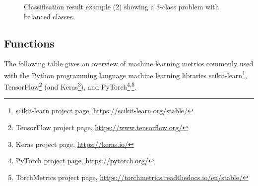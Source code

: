 \documentclass{article}
\begin{document}
\begin{figure}[H]
{}

	\caption{Classification result example (2) showing a 3-class problem with balanced classes.}
	\label{figure:ML_example2}
\end{figure}




\clearpage
\subsection*{Functions}

The following table gives an overview of machine learning metrics commonly used with the Python programming language machine learning libraries scikit-learn\footnote{scikit-learn project page, \url{https://scikit-learn.org/stable/}}, TensorFlow\footnote{TensorFlow project page, \url{https://www.tensorflow.org/}} (and Keras\footnote{Keras project page, \url{https://keras.io/}}), and PyTorch\footnote{PyTorch project page, \url{https://pytorch.org/}}\textsuperscript{,}\footnote{TorchMetrics project page, \url{https://torchmetrics.readthedocs.io/en/stable/}}.
\end{document}

